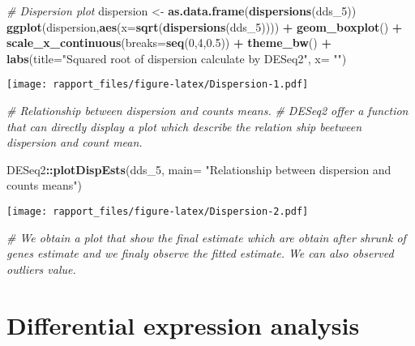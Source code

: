 \documentclass[]{article}
\newenvironment{Shaded}{\begin{snugshade}}{\end{snugshade}}
\newcommand{\KeywordTok}[1]{\textcolor[rgb]{0.13,0.29,0.53}{\textbf{#1}}}
\newcommand{\DataTypeTok}[1]{\textcolor[rgb]{0.13,0.29,0.53}{#1}}
\newcommand{\DecValTok}[1]{\textcolor[rgb]{0.00,0.00,0.81}{#1}}
\newcommand{\FloatTok}[1]{\textcolor[rgb]{0.00,0.00,0.81}{#1}}
\newcommand{\StringTok}[1]{\textcolor[rgb]{0.31,0.60,0.02}{#1}}
\newcommand{\CommentTok}[1]{\textcolor[rgb]{0.56,0.35,0.01}{\textit{#1}}}
\newcommand{\OperatorTok}[1]{\textcolor[rgb]{0.81,0.36,0.00}{\textbf{#1}}}
\newcommand{\NormalTok}[1]{#1}
\begin{document}
\begin{Shaded}
\begin{Highlighting}[]
\CommentTok{# Dispersion plot }
\NormalTok{dispersion <-}\StringTok{ }\KeywordTok{as.data.frame}\NormalTok{(}\KeywordTok{dispersions}\NormalTok{(dds_}\DecValTok{5}\NormalTok{))}
\KeywordTok{ggplot}\NormalTok{(dispersion,}\KeywordTok{aes}\NormalTok{(}\DataTypeTok{x=}\KeywordTok{sqrt}\NormalTok{(}\KeywordTok{dispersions}\NormalTok{(dds_}\DecValTok{5}\NormalTok{)))) }\OperatorTok{+}\StringTok{ }\KeywordTok{geom_boxplot}\NormalTok{() }\OperatorTok{+}\StringTok{ }\KeywordTok{scale_x_continuous}\NormalTok{(}\DataTypeTok{breaks=}\KeywordTok{seq}\NormalTok{(}\DecValTok{0}\NormalTok{,}\DecValTok{4}\NormalTok{,}\FloatTok{0.5}\NormalTok{)) }\OperatorTok{+}\StringTok{ }\KeywordTok{theme_bw}\NormalTok{() }\OperatorTok{+}\StringTok{ }\KeywordTok{labs}\NormalTok{(}\DataTypeTok{title=}\StringTok{"Squared root of dispersion calculate by DESeq2"}\NormalTok{, }\DataTypeTok{x=} \StringTok{""}\NormalTok{)}
\end{Highlighting}
\end{Shaded}

\texttt{[image: rapport\_files/figure-latex/Dispersion-1.pdf]}

\begin{Shaded}
\begin{Highlighting}[]
\CommentTok{# Relationship between dispersion and counts means.}
\CommentTok{# DESeq2 offer a function that can directly display a plot which describe the relation ship beetween dispersion and count mean.}

\NormalTok{DESeq2}\OperatorTok{::}\KeywordTok{plotDispEsts}\NormalTok{(dds_}\DecValTok{5}\NormalTok{, }\DataTypeTok{main=} \StringTok{"Relationship between dispersion and counts means"}\NormalTok{)}
\end{Highlighting}
\end{Shaded}

\texttt{[image: rapport\_files/figure-latex/Dispersion-2.pdf]}

\begin{Shaded}
\begin{Highlighting}[]
\CommentTok{# We obtain a plot that show the final estimate which are obtain after shrunk of genes estimate and we finaly observe the fitted estimate. We can also observed outliers value.}
\end{Highlighting}
\end{Shaded}

\section{Differential expression
analysis}\label{differential-expression-analysis}
\end{document}
